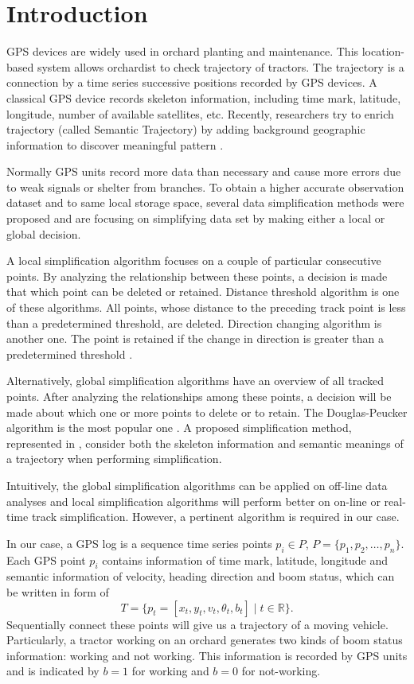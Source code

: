 
\section{Introduction}

GPS devices are widely used in orchard planting and maintenance. This location-based system allows orchardist to check trajectory of tractors. The trajectory is a connection by a time series successive positions recorded by GPS devices. A classical GPS device records skeleton information, including time mark, latitude, longitude, number of available satellites, etc. Recently, researchers try to enrich trajectory (called Semantic Trajectory) by adding background geographic information to discover meaningful pattern \cite{ying2011semantic}. 


Normally GPS units record more data than necessary and cause more errors due to weak signals or shelter from branches. To obtain a higher accurate observation dataset and to same local storage space, several data simplification methods were proposed and are focusing on simplifying data set by making either a local or global decision. 

A local simplification algorithm focuses on a couple of particular consecutive points. By analyzing the relationship between these points, a decision is made that which point can be deleted or retained. Distance threshold algorithm is one of these algorithms. All points, whose distance to the preceding track point is less than a predetermined threshold, are deleted. Direction changing algorithm is another one. The point is retained if the change in direction is greater than a predetermined threshold  \cite{ivanov2012real}. 

Alternatively, global simplification algorithms have an overview of all tracked points. After analyzing the relationships among these points, a decision will be made about which one or more points to delete or to retain. The Douglas-Peucker algorithm is the most popular one  \cite{douglas1973algorithms}. A proposed simplification method, represented in \cite{chen2009trajectory}, consider both the skeleton information and semantic meanings of a trajectory when performing simplification. 


Intuitively, the global simplification algorithms can be applied on off-line data analyses and local simplification algorithms will perform better on on-line or real-time track simplification. However, a pertinent algorithm is required in our case. 


In our case, a GPS log is a sequence time series points $p_i \in P$, $P=\{ p_1,p_2, \ldots, p_n \}$. Each GPS point $p_i$ contains information of time mark, latitude, longitude and semantic information of velocity, heading direction and boom status, which can be written in form of
\begin{equation}
T=\{p_t=[x_t,y_t,v_t,\theta_t,b_t] \mid t \in \mathbb{R} \}.
\end{equation}
Sequentially connect these points will give us a trajectory of a moving vehicle.
Particularly, a tractor working on an orchard generates two kinds of boom status information: working and not working. This information is recorded by GPS units and is indicated by $b=1$ for working and $b=0$ for not-working.


